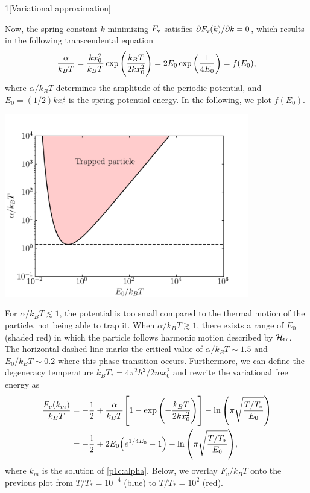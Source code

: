 \documentclass[12pt]{article}
\begin{document}
\begin{problem}{1}[Variational approximation]
\begin{solution}
\begin{equation}
\end{equation}
Now, the spring constant $k$ minimizing $F_{\text{v}}$ satisfies $\partial
F_{\text{v}}(k)/\partial k=0$, which results in the following transcendental equation
\begin{equation}\label{p1c:alpha}
    \frac{\alpha}{k_BT}=\frac{kx_0^2}{k_BT}\exp\qty(\frac{k_BT}{2kx_0^2})
    =2E_0\exp\qty(\frac1{4E_0})=f(E_0),
\end{equation}
where $\alpha/k_BT$ determines the amplitude of the periodic potential, and
$E_0=(1/2)kx_0^2$ is the spring potential energy. In the following, we plot
$f(E_0)$.
\begin{center}
    \includegraphics[width=0.8\textwidth]{p1c_1.png} 
\end{center}
For $\alpha/k_BT\lesssim1$, the potential is too small compared to the thermal
motion of the particle, not being able to trap it. When $\alpha/k_BT\gtrsim1$, 
there exists a range of $E_0$ (shaded red) in which the particle follows
harmonic motion described by $\mathcal{H}_{\text{tr}}$. The horizontal dashed line marks the
critical value of $\alpha/k_BT\sim1.5$ and $E_0/k_BT\sim 0.2$ where this phase 
transition occurs. Furthermore, we can define the degeneracy temperature
$k_BT_\ast=4\pi^2\hbar^2/2mx_0^2$ and rewrite the variational free energy as
\begin{align}
    \frac{F_v(k_m)}{k_BT}
    &=-\frac12+\frac{\alpha}{k_BT}\qty[1-\exp\qty(-\frac{k_BT}{2kx_0^2})]
    -\ln\qty(\pi\sqrt{\frac{T/T_\ast}{E_0}})\notag\\
    &=-\frac12+2E_0\qty(e^{1/4E_0}-1)-\ln\qty(\pi\sqrt{\frac{T/T_\ast}{E_0}}),
\end{align}
where $k_m$ is the solution of \eqref{p1c:alpha}. Below, we overlay $F_v/k_BT$
onto the previous plot from $T/T_\ast=10^{-4}$ (blue) to $T/T_\ast=10^2$ (red).

\end{solution}
\end{problem}
\end{document}
